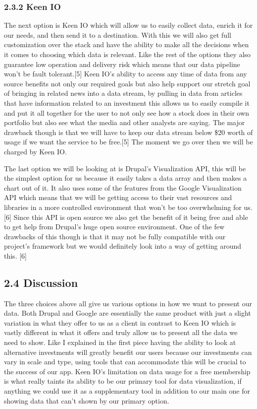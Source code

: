 \documentclass[onecolumn, draftclsnofoot,10pt, compsoc]{IEEEtran}
\begin{document}
\subsubsection{2.3.2 Keen IO}
The next option is Keen IO which will allow us to easily collect data, enrich it for our needs, and then send it to a destination. With this we will also get full customization over the stack and have the ability to make all the decisions when it comes to choosing which data is relevant. Like the rest of the options they also guarantee low operation and delivery risk which means that our data pipeline won’t be fault tolerant.[5] Keen IO’s ability to access any time of data from any source benefits not only our required goals but also help support our stretch goal of bringing in related news into a data stream, by pulling in data from articles that have information related to an investment this allows us to easily compile it and put it all together for the user to not only see how a stock does in their own portfolio but also see what the media and other analysts are saying. The major drawback though is that we will have to keep our data stream below \$20 worth of usage if we want the service to be free.[5] The moment we go over then we will be charged by Keen IO. 

The last option we will be looking at is Drupal’s Visualization API, this will be the simplest option for us because it easily takes a data array and then makes a chart out of it. It also uses some of the features from the Google Visualization API which means that we will be getting access to their vast resources and libraries in a more controlled environment that won’t be too overwhelming for us.[6] Since this API is open source we also get the benefit of it being free and able to get help from Drupal’s huge open source environment. One of the few drawbacks of this though is that it may not be fully compatible with our project’s framework but we would definitely look into a way of getting around this. [6]

\subsection{2.4 Discussion}
The three choices above all give us various options in how we want to present our data. Both Drupal and Google are essentially the same product with just a slight variation in what they offer to us as a client in contrast to Keen IO which is vastly different in what it offers and truly allow us to present all the data we need to show. Like I explained in the first piece having the ability to look at alternative investments will greatly benefit our users because our investments can vary in scale and type, using tools that can accommodate this will be crucial to the success of our app. Keen IO’s limitation on data usage for a free membership is what really taints its ability to be our primary tool for data visualization, if anything we could use it as a supplementary tool in addition to our main one for showing data that can’t shown by our primary option. 
\end{document}
